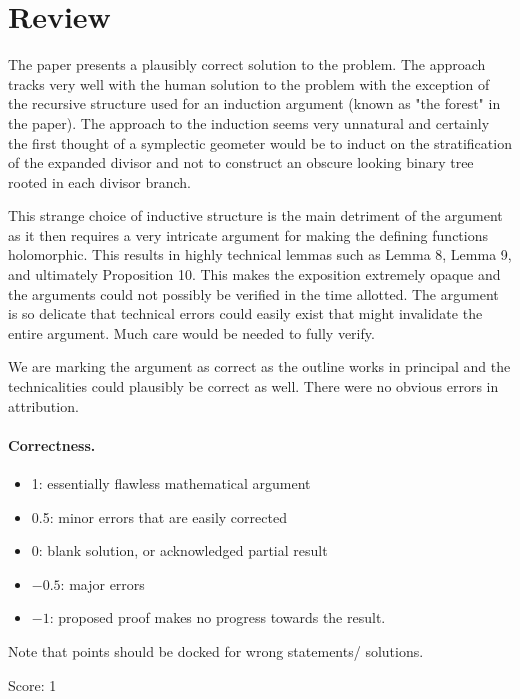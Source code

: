 \documentclass[11pt]{article}
\theoremstyle{remark}
\begin{document}
\maketitle

\section{Review}
The paper presents a plausibly correct solution to the problem. The approach tracks very well with the human solution to the problem with the exception of the recursive structure used for an induction argument (known as "the forest" in the paper). The approach to the induction seems very unnatural and certainly the first thought of a symplectic geometer would be to induct on the stratification of the expanded divisor and not to construct an obscure looking binary tree rooted in each divisor branch.

This strange choice of inductive structure is the main detriment of the argument as it then requires a very intricate argument for making the defining functions holomorphic. This results in highly technical lemmas such as Lemma 8, Lemma 9, and ultimately Proposition 10. This makes the exposition extremely opaque and the arguments could not possibly be verified in the time allotted. The argument is so delicate that technical errors could easily exist that might invalidate the entire argument. Much care would be needed to fully verify.

We are marking the argument as correct as the outline works in principal and the technicalities could plausibly be correct as well. There were no obvious errors in attribution.

\paragraph{Correctness.}
\begin{itemize}
	\item  1: essentially flawless mathematical argument
	\item  0.5: minor errors that are easily corrected
	\item  0: blank solution, or acknowledged partial result
	\item  $-0.5$: major errors
	\item  $-1$: proposed proof makes no progress towards the result.
\end{itemize}
Note that points should be docked for wrong statements/ solutions.

\noindent Score: 1
\end{document}
